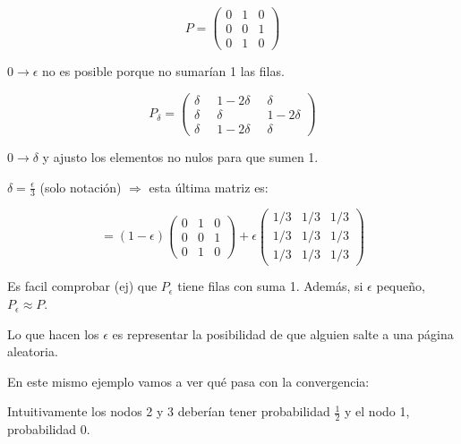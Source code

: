 \begin{example}

\begin{figure}[hbtp]
	\centering
\end{figure}

	$$P = \left( \begin{array}{ccc}
0 & 1 & 0 \\
0 & 0 & 1 \\
0 & 1 & 0 \end{array} \right)$$

$0 \rightarrow \epsilon$ no es posible porque no sumarían 1 las filas.



$$P_{\delta} = \left( \begin{array}{ccc}
\delta & \;\; 1-2\delta \;\; & \delta \\
\delta & \;\; \delta \;\;& 1 - 2 \delta\\
\delta & \;\; 1 - 2 \delta \;\; & \delta \end{array} \right)$$

$0 \rightarrow \delta$ y ajusto los elementos no nulos para que sumen 1.


$\delta = \frac{\epsilon}{3}$ (solo notación) $\Rightarrow$ esta última matriz es:


$$= (1-\epsilon)\left( \begin{array}{ccc}
0 & 1 & 0 \\
0 & 0 & 1 \\
0 & 1 & 0 \end{array} \right) + \epsilon \left( \begin{array}{ccc}
1/3 & 1/3 & 1/3 \\
1/3 & 1/3 & 1/3 \\
1/3 & 1/3 & 1/3 \end{array} \right)$$


Es facil comprobar (ej) que $P_{\epsilon}$ tiene filas con suma 1. Además, si $\epsilon$ pequeño, $P_{\epsilon} ≈ P$.

Lo que hacen los $\epsilon$ es representar la posibilidad de que alguien salte a una página aleatoria.

\begin{figure}[hbtp]
	\centering
\end{figure}


En este mismo ejemplo vamos a ver qué pasa con la convergencia:

Intuitivamente los nodos 2 y 3 deberían tener probabilidad $\frac{1}{2}$ y el nodo 1, probabilidad 0.


\end{example}
